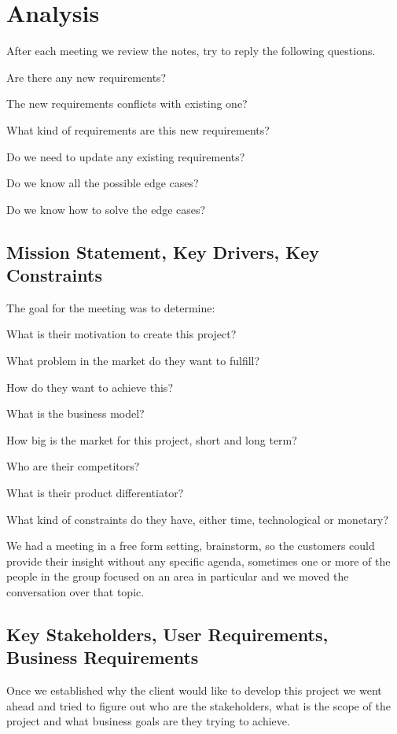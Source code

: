 \section{Analysis}
After each meeting we review the notes, try to reply the following questions.
\begin{packed_enum}
    \item Are there any new requirements?
    \item The new requirements conflicts with existing one?
    \item What kind of requirements are this new requirements?
    \item Do we need to update any existing requirements?
    \item Do we know all the possible edge cases?
    \item Do we know how to solve the edge cases?
\end{packed_enum}

\subsection{Mission Statement, Key Drivers, Key Constraints}
The goal for the meeting was to determine:
\begin{packed_enum}
    \item What is their motivation to create this project?
    \item What problem in the market do they want to fulfill?
    \item How do they want to achieve this?
    \item What is the business model?
    \item How big is the market for this project, short and long term?
    \item Who are their competitors?
    \item What is their product differentiator?
    \item What kind of constraints do they have, either time, 
    technological or monetary?
\end{packed_enum}

\noindent We had a meeting in a free form setting, brainstorm, so the customers could 
provide their insight without any specific agenda, sometimes one or more of the 
people in the group focused on an area in particular and we moved the 
conversation over that topic.

\pagebreak
\subsection{Key Stakeholders, User Requirements, Business Requirements}
Once we established why the client would like to develop this project we went 
ahead and tried to figure out who are the stakeholders, what is the scope of 
the project and what business goals are they trying to achieve. \newline

